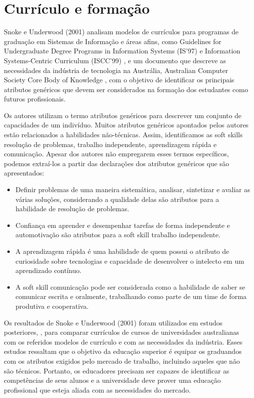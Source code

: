 \section{Currículo e formação}
\label{sec:curriculos}

Snoke e Underwood (2001)\nocite{snoke:01} analisam modelos de currículos para programas de graduação em Sistemas de Informação e áreas afins,
como  Guidelines for Undergraduate Degree Programs in Information Systems (IS’97) \cite{is97}
e     Information Systems-Centric Curriculum (ISCC'99) \cite{iscc99},
e um documento que descreve as necessidades da indústria de tecnologia na Austrália,
Australian Computer Society Core Body of Knowledge \cite{acs},
com o objetivo de identificar os principais atributos genéricos que devem ser considerados na formação dos estudantes como futuros profissionais.

Os autores utilizam o termo atributos genéricos para descrever um conjunto de capacidades de um indivíduo. Muitos atributos genéricos apontados pelos autores estão relacionados a habilidades não-técnicas. Assim, identificamos as soft skills resolução de problemas, trabalho independente, aprendizagem rápida e comunicação. Apesar dos autores não empregarem esses termos específicos, podemos extraí-los a partir das declarações dos atributos genéricos que são apresentados:

\begin{itemize}
	\item Definir problemas de uma maneira sistemática, analisar, sintetizar e avaliar as várias soluções, considerando a qualidade delas são atributos para a habilidade de resolução de problemas.
	\item Confiança em aprender e desempenhar tarefas de forma independente e automotivação são atributos para a soft skill trabalho independente.
	\item	A aprendizagem rápida é uma habilidade de quem possui o atributo de curiosidade sobre tecnologias e capacidade de desenvolver o intelecto em um aprendizado contínuo.
	\item	A soft skill comunicação pode ser considerada como a habilidade de saber se comunicar escrita e oralmente, trabalhando como parte de um time de forma produtiva e cooperativa.
\end{itemize}

Os resultados de Snoke e Underwood (2001)\nocite{snoke:01} foram utilizados em estudos posteriores, \cite{snoke:02, snoke:03}, para comparar currículos de cursos de universidades australianas com os referidos modelos de currículo e com as necessidades da indústria. 
Esses estudos ressaltam que o objetivo da educação superior é equipar os graduandos com os atributos exigidos pelo mercado de trabalho, incluindo aqueles que não são técnicos. Portanto, os educadores precisam ser capazes de identificar as competências de seus alunos e a universidade deve prover uma educação profissional que esteja aliada com as necessidades do mercado.

